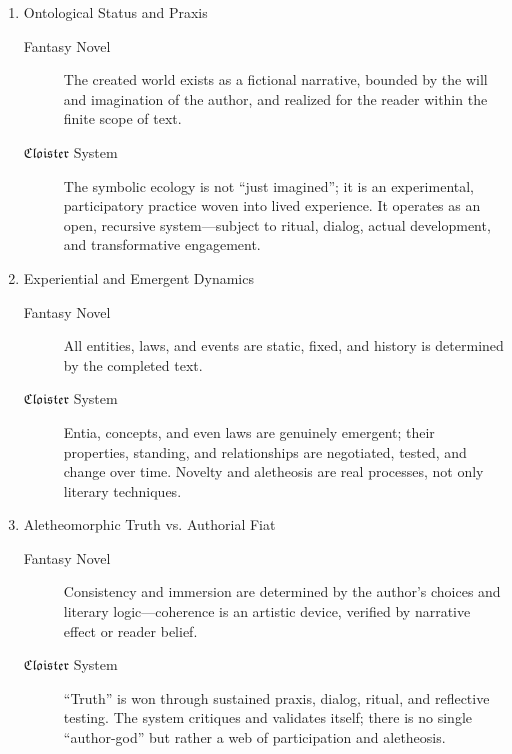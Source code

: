 \begin{enumerate}
  \item Ontological Status and Praxis
  \begin{description}

    \item[Fantasy Novel] The created world exists as a fictional narrative,
      bounded by the will and imagination of the author, and realized for the
      reader within the finite scope of text.

    \item[$\mathfrak{Cloister}$ System] The symbolic ecology is not “just imagined”; it is
      an experimental, participatory practice woven into lived experience. It
      operates as an open, recursive system—subject to ritual, dialog, actual
      development, and transformative engagement.

  \end{description}

  \item Experiential and Emergent Dynamics
  \begin{description}

    \item[Fantasy Novel] All entities, laws, and events are static, fixed, and
      history is determined by the completed text.

    \item[$\mathfrak{Cloister}$ System] Entia, concepts, and even laws are genuinely
      emergent; their properties, standing, and relationships are negotiated,
      tested, and change over time. Novelty and aletheosis are real processes,
      not only literary techniques.

  \end{description}

  \item Aletheomorphic Truth vs. Authorial Fiat
  \begin{description}

    \item[Fantasy Novel] Consistency and immersion are determined by the
      author’s choices and literary logic—coherence is an artistic device,
      verified by narrative effect or reader belief.

    \item[$\mathfrak{Cloister}$  System] “Truth” is won through sustained praxis, dialog,
      ritual, and reflective testing. The system critiques and validates
      itself; there is no single “author-god” but rather a web of participation
      and aletheosis.


\end{description}
\end{enumerate}
